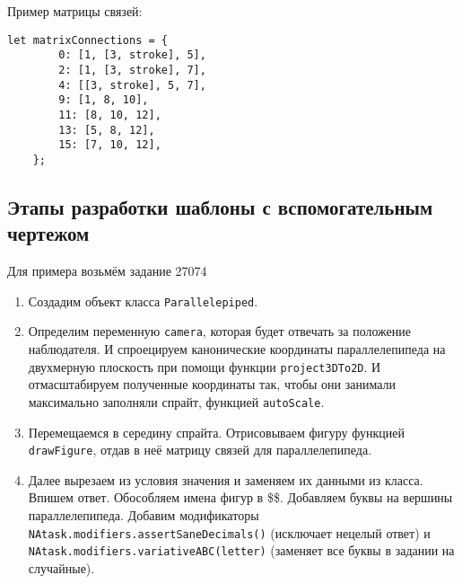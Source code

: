 Пример матрицы связей:
\begin{lstlisting}[frame=none]
	let matrixConnections = {
		0: [1, [3, stroke], 5],
		2: [1, [3, stroke], 7],
		4: [[3, stroke], 5, 7],
		9: [1, 8, 10],
		11: [8, 10, 12],
		13: [5, 8, 12],
		15: [7, 10, 12],
	};
	\end{lstlisting}

\subsection{Этапы разработки шаблоны с вспомогательным чертежом}

Для примера возьмём задание 27074



\begin{enumerate}
	\item Создадим объект класса \texttt{Parallelepiped}. 
	
	\item Определим переменную \texttt{camera}, которая будет отвечать за положение наблюдателя. И спроецируем канонические координаты параллелепипеда на двухмерную плоскость при помощи функции \texttt{project3DTo2D}. И отмасштабируем полученные координаты так, чтобы они занимали максимально заполняли спрайт, функцией \texttt{autoScale}.
	
	\item Перемещаемся в середину спрайта. Отрисовываем фигуру функцией \texttt{drawFigure}, отдав в неё матрицу связей для параллелепипеда. 
	
	\item Далее вырезаем из условия значения и заменяем их данными из класса. Впишем ответ. Обособляем имена фигур в \$\$. Добавляем буквы на вершины параллелепипеда. Добавим модификаторы          \texttt{NAtask.modifiers.assertSaneDecimals()} (исключает нецелый ответ) и
	\texttt{NAtask.modifiers.variativeABC(letter)} (заменяет все буквы в задании на случайные).
	
\end{enumerate}
